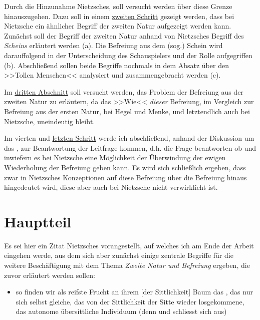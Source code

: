 \documentclass[12pt, a4paper, openany]{report}
\begin{document}
Durch die Hinzunahme Nietzsches, soll versucht werden über diese Grenze hinauszugehen.
Dazu soll in einem \hyperref[abschnitt_2]{zweiten Schritt} gezeigt werden, dass bei Nietzsche ein ähnlicher Begriff der zweiten Natur aufgezeigt werden kann.
Zunächst soll der Begriff der zweiten Natur anhand von Nietzsches Begriff des \textit{Scheins} erläutert werden (a).
Die Befreiung aus dem (sog.) Schein wird darauffolgend in der Unterscheidung des Schauspielers und der Rolle aufgegriffen (b). 
Abschließend sollen beide Begriffe nochmals in dem Absatz über den >>Tollen Menschen<< analysiert und zusammengebracht werden (c).

Im \hyperref[abschnitt_3]{dritten Abschnitt} soll versucht werden, das Problem der Befreiung aus der zweiten Natur zu erläutern, da das >>Wie<< \emph{dieser} Befreiung, im Vergleich zur Befreiung aus der ersten Natur, bei Hegel und Menke, und letztendlich auch bei Nietzsche, uneindeutig bleibt.

Im vierten und \hyperref[abschnitt_4]{letzten Schritt} werde ich abschließend, anhand der Diskussion um das , zur Beantwortung der Leitfrage kommen, d.h. die Frage beantworten ob und inwiefern es bei Nietzsche eine Möglichkeit der Überwindung der ewigen Wiederholung der Befreiung geben kann. 
Es wird sich schließlich ergeben, dass zwar in Nietzsches Konzeptionen auf diese Befreiung über die Befreiung hinaus hingedeutet wird, diese aber auch bei Nietzsche nicht verwirklicht ist.


\chapter{Hauptteil}

Es sei hier ein Zitat Nietzsches vorangestellt, auf welches ich am Ende der Arbeit eingehen werde, aus dem sich aber zunächst einige zentrale Begriffe für die weitere Beschäftigung mit dem Thema \emph{Zweite Natur und Befreiung} ergeben, die zuvor erläutert werden sollen:
\begin{itemize}
    \item[] \textelp{} so finden wir als reifste Frucht an ihrem [der Sittlichkeit] Baum das  , das nur sich selbst gleiche, das von der Sittlichkeit der Sitte wieder losgekommene, das autonome übersittliche Individuum (denn  und  schliesst sich aus) \textelp{} 
\end{itemize}
\end{document}
